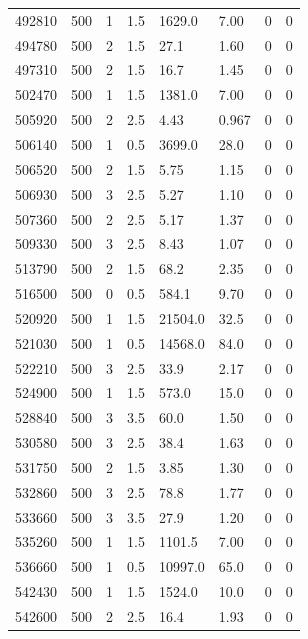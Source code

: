 \documentclass[preview]{standalone}
\begin{document}
{{{{{\begin{tabular}{L{1.2cm}C{1.2cm} C{0.3cm}C{0.5cm} C{1.4cm}C{1.4cm} C{1.4cm}C{1.4cm}}
  492810  &   500  & 1     & 1.5 &  1629.0  & 7.00  & 0 &  0   \\ 
  494780  &   500  & 2     & 1.5 &  27.1  & 1.60  & 0 &  0   \\ 
  497310  &   500  & 2     & 1.5 &  16.7  & 1.45  & 0 &  0   \\ 
  502470  &   500  & 1     & 1.5 &  1381.0  & 7.00  & 0 &  0   \\ 
  505920  &   500  & 2     & 2.5 &  4.43  & 0.967  & 0 &  0   \\ 
  506140  &   500  & 1     & 0.5 &  3699.0  & 28.0  & 0 &  0   \\ 
  506520  &   500  & 2     & 1.5 &  5.75  & 1.15  & 0 &  0   \\ 
  506930  &   500  & 3     & 2.5 &  5.27  & 1.10  & 0 &  0   \\ 
  507360  &   500  & 2     & 2.5 &  5.17  & 1.37  & 0 &  0   \\ 
  509330  &   500  & 3     & 2.5 &  8.43  & 1.07  & 0 &  0   \\ 
  513790  &   500  & 2     & 1.5 &  68.2  & 2.35  & 0 &  0   \\ 
  516500  &   500  & 0     & 0.5 &  584.1  & 9.70  & 0 &  0   \\ 
  520920  &   500  & 1     & 1.5 &  21504.0  & 32.5  & 0 &  0   \\ 
  521030  &   500  & 1     & 0.5 &  14568.0  & 84.0  & 0 &  0   \\ 
  522210  &   500  & 3     & 2.5 &  33.9  & 2.17  & 0 &  0   \\ 
  524900  &   500  & 1     & 1.5 &  573.0  & 15.0  & 0 &  0   \\ 
  528840  &   500  & 3     & 3.5 &  60.0  & 1.50  & 0 &  0   \\ 
  530580  &   500  & 3     & 2.5 &  38.4  & 1.63  & 0 &  0   \\ 
  531750  &   500  & 2     & 1.5 &  3.85  & 1.30  & 0 &  0   \\ 
  532860  &   500  & 3     & 2.5 &  78.8  & 1.77  & 0 &  0   \\ 
  533660  &   500  & 3     & 3.5 &  27.9  & 1.20  & 0 &  0   \\ 
  535260  &   500  & 1     & 1.5 &  1101.5  & 7.00  & 0 &  0   \\ 
  536660  &   500  & 1     & 0.5 &  10997.0  & 65.0  & 0 &  0   \\ 
  542430  &   500  & 1     & 1.5 &  1524.0  & 10.0  & 0 &  0   \\ 
  542600  &   500  & 2     & 2.5 &  16.4  & 1.93  & 0 &  0   \\ 
\hline 
\end{tabular} 

}}}}}
\end{document}
